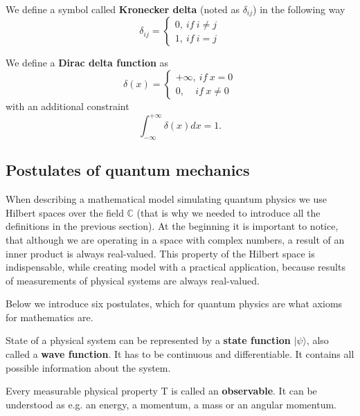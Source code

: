 \begin{definition}
We define a symbol called \textbf{Kronecker delta} (noted as $\delta_{ij}$) in the following way
\[ \delta_{ij} = \begin{cases}
    0,\ if\ i \neq j \\
    1,\ if\ i = j
\end{cases} \]
\end{definition}

\begin{definition}
We define a \textbf{Dirac delta function} as
\[ \delta(x) = \begin{cases}
    +\infty, \ if \ x = 0 \\
    0, \ \ \ \ \ if \ x \neq 0
\end{cases}\]
with an additional constraint
\[ \int_{-\infty}^{+\infty} \delta(x)dx = 1. \]
\end{definition}

\subsection{Postulates of quantum mechanics}

When describing a mathematical model simulating quantum physics we use Hilbert spaces over the field $\mathbb{C}$ (that is why we needed to introduce all the definitions in the previous section). At the beginning it is important to notice, that although we are operating in a space with complex numbers, a result of an inner product is always real-valued. This property of the Hilbert space is indispensable, while creating model with a practical application, because results of measurements of physical systems are always real-valued.

Below we introduce six postulates, which for quantum physics are what axioms for mathematics are.

\begin{postulate}
State of a physical system can be represented by a \textbf{state function} $|\psi \rangle$, also called a \textbf{wave function}. It has to be continuous and differentiable. It contains all possible information about the system.
\end{postulate}

\begin{definition}
Every measurable physical property T is called an \textbf{observable}. It can be understood as e.g. an energy, a momentum, a mass or an angular momentum.
\end{definition}

